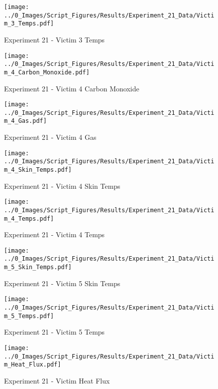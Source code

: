 	\begin{figure}[H]
		\centering
		\texttt{[image: ../0\_Images/Script\_Figures/Results/Experiment\_21\_Data/Victim\_3\_Temps.pdf]}
		\caption[]{Experiment 21 - Victim 3 Temps}
	\end{figure}
 
	\clearpage

	\begin{figure}[H]
		\centering
		\texttt{[image: ../0\_Images/Script\_Figures/Results/Experiment\_21\_Data/Victim\_4\_Carbon\_Monoxide.pdf]}
		\caption[]{Experiment 21 - Victim 4 Carbon Monoxide}
	\end{figure}
 

	\begin{figure}[H]
		\centering
		\texttt{[image: ../0\_Images/Script\_Figures/Results/Experiment\_21\_Data/Victim\_4\_Gas.pdf]}
		\caption[]{Experiment 21 - Victim 4 Gas}
	\end{figure}
 
	\clearpage

	\begin{figure}[H]
		\centering
		\texttt{[image: ../0\_Images/Script\_Figures/Results/Experiment\_21\_Data/Victim\_4\_Skin\_Temps.pdf]}
		\caption[]{Experiment 21 - Victim 4 Skin Temps}
	\end{figure}
 

	\begin{figure}[H]
		\centering
		\texttt{[image: ../0\_Images/Script\_Figures/Results/Experiment\_21\_Data/Victim\_4\_Temps.pdf]}
		\caption[]{Experiment 21 - Victim 4 Temps}
	\end{figure}
 
	\clearpage

	\begin{figure}[H]
		\centering
		\texttt{[image: ../0\_Images/Script\_Figures/Results/Experiment\_21\_Data/Victim\_5\_Skin\_Temps.pdf]}
		\caption[]{Experiment 21 - Victim 5 Skin Temps}
	\end{figure}
 

	\begin{figure}[H]
		\centering
		\texttt{[image: ../0\_Images/Script\_Figures/Results/Experiment\_21\_Data/Victim\_5\_Temps.pdf]}
		\caption[]{Experiment 21 - Victim 5 Temps}
	\end{figure}
 
	\clearpage

	\begin{figure}[H]
		\centering
		\texttt{[image: ../0\_Images/Script\_Figures/Results/Experiment\_21\_Data/Victim\_Heat\_Flux.pdf]}
		\caption[]{Experiment 21 - Victim Heat Flux}
	\end{figure}
 

